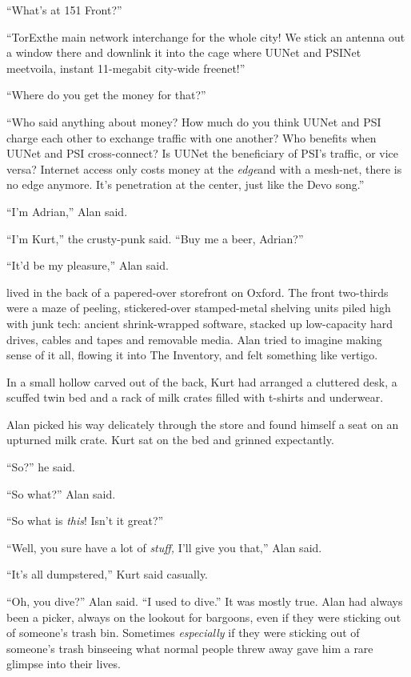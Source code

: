 ``What's at 151 Front?''

``TorEx\dash{}the main network interchange for the whole city!  We stick
an antenna out a window there and downlink it into the cage where
UUNet and PSINet meet\dash{}voila, instant 11-megabit city-wide freenet!''

``Where do you get the money for that?''

``Who said anything about money?  How much do you think UUNet and PSI
charge each other to exchange traffic with one another?  Who benefits
when UUNet and PSI cross-connect?  Is UUNet the beneficiary of PSI's
traffic, or vice versa?  Internet access only costs money at the
\textit{edge}\dash{}and with a mesh-net, there is no edge anymore.  It's
penetration at the center, just like the Devo song.''

``I'm Adrian,'' Alan said.

``I'm Kurt,'' the crusty-punk said.  ``Buy me a beer, Adrian?''

``It'd be my pleasure,'' Alan said.

 lived in the back of a papered-over storefront on Oxford.  The
front two-thirds were a maze of peeling, stickered-over stamped-metal
shelving units piled high with junk tech:  ancient shrink-wrapped
software, stacked up low-capacity hard drives, cables and tapes and
removable media.  Alan tried to imagine making sense of it all,
flowing it into The Inventory, and felt something like vertigo.

In a small hollow carved out of the back, Kurt had arranged a
cluttered desk, a scuffed twin bed and a rack of milk crates filled
with t-shirts and underwear.

Alan picked his way delicately through the store and found himself a
seat on an upturned milk crate.  Kurt sat on the bed and grinned
expectantly.

``So?'' he said.

``So what?'' Alan said.

``So what is \textit{this}!  Isn't it great?''

``Well, you sure have a lot of \textit{stuff,} I'll give you that,''
Alan said.

``It's all dumpstered,'' Kurt said casually.

``Oh, you dive?'' Alan said.  ``I used to dive.'' It was mostly true. 
Alan had always been a picker, always on the lookout for bargoons,
even if they were sticking out of someone's trash bin.  Sometimes
\textit{especially} if they were sticking out of someone's trash
bin\dash{}seeing what normal people threw away gave him a rare glimpse
into their lives.

